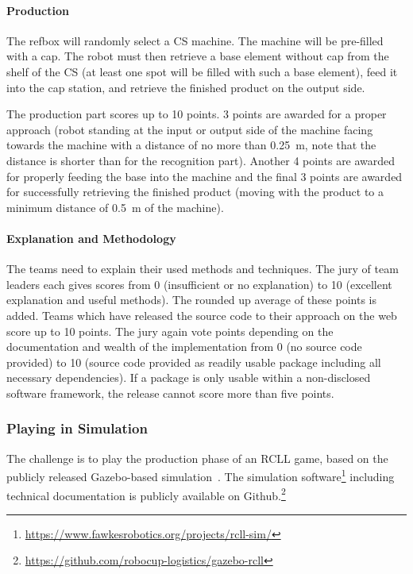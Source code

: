 \documentclass[12pt,twoside]{article}
\begin{document}
\vspace{-2ex}\paragraph{Production}
The refbox will randomly select a CS machine. The machine will be
pre-filled with a cap. The robot must then retrieve a base element
without cap from the shelf of the CS (at least one spot will be filled
with such a base element), feed it into the cap station, and retrieve
the finished product on the output side.

The production part scores up to 10 points. 3 points are awarded for a
proper approach (robot standing at the input or output side of the
machine facing towards the machine with a distance of no more than
\SI{0.25}{\metre}, note that the distance is shorter than for the
recognition part). Another 4 points are awarded for properly feeding
the base into the machine and the final 3 points are awarded for
successfully retrieving the finished product (moving with the product
to a minimum distance of \SI{0.5}{\metre} of the machine).

\vspace{-2ex}\paragraph{Explanation and Methodology}
%
The teams need to explain their used methods and techniques. The jury
of team leaders each gives scores from 0 (insufficient or no
explanation) to 10 (excellent explanation and useful methods). The
rounded up average of these points is added. Teams which have released
the source code to their approach on the web score up to 10
points. The jury again vote points depending on the documentation and
wealth of the implementation from 0 (no source code provided) to 10
(source code provided as readily usable package including all
necessary dependencies). If a package is only usable within a
non-disclosed software framework, the release cannot score more than
five points.


\subsubsection{Playing in Simulation}

The challenge is to play the production phase of an RCLL game, based
on the publicly released Gazebo-based simulation~\cite{llsf-sim-rc2014-2014}.
The simulation
software\footnote{\url{https://www.fawkesrobotics.org/projects/rcll-sim/}}
including technical documentation is publicly available on
Github.\footnote{\url{https://github.com/robocup-logistics/gazebo-rcll}}
\end{document}
